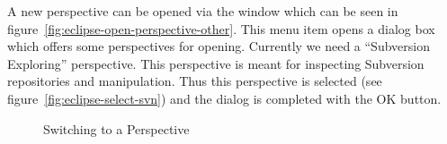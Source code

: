 A new perspective can be opened via the
window  which can
be seen in figure~\ref{fig:eclipse-open-perspective-other}. This menu
item opens a dialog box which offers some perspectives for opening.
Currently we need a ``Subversion Exploring'' perspective. This
perspective is meant for inspecting Subversion repositories and
manipulation. Thus this perspective is selected (see
figure~\ref{fig:eclipse-select-svn}) and the dialog is completed with
the OK button.
\begin{figure}[ht]
  \hbox{}\hfill
  \hfill
  \hfill\hbox{}

  \caption{Switching to a Perspective}\label{fig:eclipse-perspective}
\end{figure}

